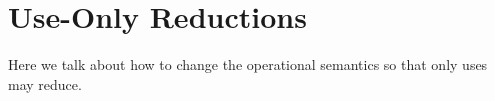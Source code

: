 \documentclass[msc,deptreport,cs]{infthesis} %
\newcommand{\justc}[1]{{\color{blue} c({#1})}}
\newcommand{\yieldc}{{\color{blue}{\textsf{yield}}}}
\newcommand\allows{\textsf{allows}\xspace}
\newcommand{\many}{\overline}
\newcommand{\bindbase}[4]{{#3} \mathbin{:} {#2} \mathbin{#1} {#4}}
\newcommand{\adj}{\Delta}
\newcommand{\sigs}{\Sigma}
\newcommand{\thunk}[1]{\{{#1}\}}
\newcommand{\effin}[1]{\langle {#1} \rangle}
\newcommand{\effout}[1]{[{#1}]}
\newcommand{\EC}{\mathcal{E}}
\newcommand{\EF}{\mathcal{F}}
\newcommand{\venv}{\theta}
\newcommand{\cu}{\mathord{\uparrow}}
\newcommand{\redtou}{\leadsto_{\mathrm{u}}}
\newcommand{\meta}{\mathsf}
\newcommand{\handles}{~\meta{handles}~}
\newcommand{\sigyields}[1]
           {\mathbin{\text{-\!-\!}[{\text{\scriptsize ${#1}$}}]\,}}
\newcommand{\bindsc}[5]{\bindbase{\sigyields{#4}}{#2 \leftarrow #3}{#1}{#5}}
\begin{document}




\chapter{Use-Only Reductions}

Here we talk about how to change the operational semantics so that only uses may
reduce.
\end{document}
